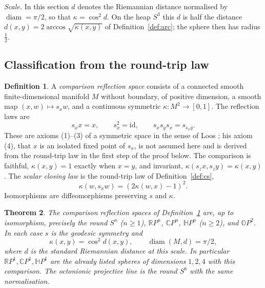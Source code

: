 \documentclass[11pt,reqno]{amsart}
\newtheorem{theorem}{Theorem}[section]
\theoremstyle{definition}
\newtheorem{definition}[theorem]{Definition}
\theoremstyle{remark}
\numberwithin{equation}{section}
\newcommand{\R}{\mathbb{R}}
\newcommand{\C}{\mathbb{C}}
\newcommand{\HH}{\mathbb{H}}
\begin{document}
\emph{Scale.}  In this section $d$ denotes the Riemannian distance normalised by $\operatorname{diam}=\pi/2$, so that $\kappa=\cos^2d$.  On
the heap $S^3$ this $d$ is half the distance $d(x,y)=2\arccos\sqrt{\kappa(x,y)}$ of Definition~\ref{def:arc}; the sphere then has radius
$\tfrac12$.

\subsection{Classification from the round-trip law}

\begin{definition}\label{m2:def}
A \emph{comparison reflection space} consists of a connected smooth finite-dimensional manifold $M$ without boundary, of positive
dimension, a smooth map $(x,w)\mapsto s_xw$, and a continuous symmetric $\kappa:M^2\to[0,1]$.  The reflection laws are
\begin{equation}\label{m2:reflection}
s_xx=x,\qquad s_x^2=\mathrm{id},\qquad s_xs_ys_x=s_{s_xy}.
\end{equation}
These are axioms (1)--(3) of a symmetric space in the sense of Loos \cite[Ch.~II, \S1]{Loos}; his axiom (4), that $x$ is an isolated
fixed point of $s_x$, is not assumed here and is derived from the round-trip law in the first step of the proof below.  The comparison
is faithful, $\kappa(x,y)=1$ exactly when $x=y$, and invariant, $\kappa(s_zx,s_zy)=\kappa(x,y)$.  The \emph{scalar closing law} is the
round-trip law of Definition~\ref{def:cs},
\begin{equation}\label{m2:closing}
\kappa(w,s_xw)=(2\kappa(w,x)-1)^2 .
\end{equation}
Isomorphisms are diffeomorphisms preserving $s$ and $\kappa$.
\end{definition}

\begin{theorem}\label{m2:classification}
The comparison reflection spaces of Definition~\ref{m2:def} are, up to isomorphism, precisely the round $S^n$ ($n\ge1$),
$\R P^n$, $\C P^n$, $\HH P^n$ ($n\ge2$), and $\mathbb O P^2$.  In each case $s$ is the geodesic symmetry and
\begin{equation}\label{m2:normalization}
\kappa(x,y)=\cos^2 d(x,y),\qquad \operatorname{diam}(M,d)=\pi/2 ,
\end{equation}
where $d$ is the standard Riemannian distance at this scale.  In particular $\R P^1,\C P^1,\HH P^1$ are the already listed spheres of
dimensions $1,2,4$ with this comparison.  The octonionic projective line is the round $S^8$ with the same normalisation.
\end{theorem}
\end{document}
